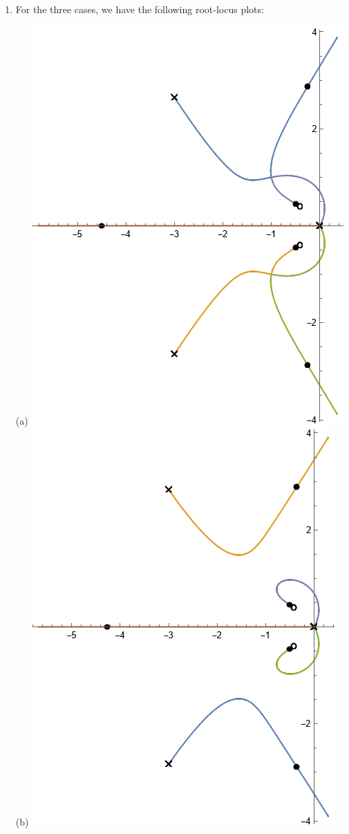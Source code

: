 \documentclass{article}
\begin{document}
\begin{enumerate}[label=\textbf{3.\arabic*}]
\begin{enumerate}[label=(\alph*)]
    Recall that $1+G(s) =0 \implies s^3+4s^2+5s+K=0.$ Then Plugging in $s=-1$ gives 
    \begin{equation}
        (-1)^3+4(-1)^2+5(-1)+K = K - 2 =0 \implies \boxed{K=2},
    \end{equation}
    and 
    \begin{equation}
        (-5/3)^3+4(-5/3)^2+5(-5/3)+K  = K - \frac{50}{27} =0 \implies \boxed{K \approx 1.85}.
    \end{equation}
    Before $K=1.85,$ we have two roots (which originated from $-2\pm i$) have a nonzero imaginary part and after $K=2,$ we have one root (which originated from $s=0$ with a nonzero imaginary part). Therefore:
    \begin{itemize}
        \item $K<1.85$ is underdamped
        \item $1.85<K<2$ is overdamped
        \item $2<K<20$ is underdamped.
    \end{itemize}
    Beyond $K=20$ it passes the imaginary axis, so it becomes unstable.
\end{enumerate}
\item For the three cases, we have the following root-locus plots:
\begin{center}
    (a)
    \includegraphics[width=0.4\linewidth]{A3_imgs/q3a.png}
    (b)
    \includegraphics[width=0.4\linewidth]{A3_imgs/q3b.png}
    

\end{center}
\end{enumerate}
\end{document}
